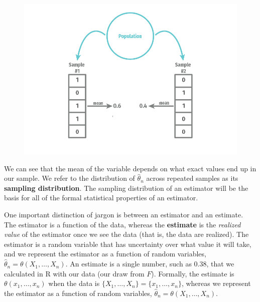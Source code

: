 \documentclass[
  letterpaper,
  DIV=11,
  numbers=noendperiod]{scrreprt}
\theoremstyle{plain}
\theoremstyle{definition}
\theoremstyle{definition}
\theoremstyle{remark}
\begin{document}
\begin{figure}[th]

{\centering \includegraphics{assets/img/sampling-distribution.png}

}

\end{figure}

We can see that the mean of the variable depends on what exact values
end up in our sample. We refer to the distribution of
\(\widehat{\theta}_n\) across repeated samples as its \textbf{sampling
distribution}. The sampling distribution of an estimator will be the
basis for all of the formal statistical properties of an estimator.

\begin{tcolorbox}[enhanced jigsaw, opacityback=0, breakable, bottomtitle=1mm, opacitybacktitle=0.6, coltitle=black, leftrule=.75mm, toptitle=1mm, colback=white, titlerule=0mm, colframe=quarto-callout-warning-color-frame, rightrule=.15mm, bottomrule=.15mm, toprule=.15mm, title=\textcolor{quarto-callout-warning-color}{\faExclamationTriangle}\hspace{0.5em}{Warning}, left=2mm, arc=.35mm, colbacktitle=quarto-callout-warning-color!10!white]

One important distinction of jargon is between an estimator and an
estimate. The estimator is a function of the data, whereas the
\textbf{estimate} is the \emph{realized value} of the estimator once we
see the data (that is, the data are realized). The estimator is a random
variable that has uncertainty over what value it will take, and we
represent the estimator as a function of random variables,
\(\widehat{\theta}_n = \theta(X_1, \ldots, X_n)\). An estimate is a
single number, such as 0.38, that we calculated in R with our data (our
draw from \(F\)). Formally, the estimate is \(\theta(x_1, \ldots, x_n)\)
when the data is \(\{X_1, \ldots, X_n\} = \{x_1, \ldots, x_n\}\),
whereas we represent the estimator as a function of random variables,
\(\widehat{\theta}_n = \theta(X_1, \ldots, X_n)\).

\end{tcolorbox}
\end{document}
